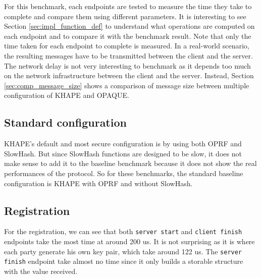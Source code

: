 \documentclass[../report.tex]{subfiles}
\begin{document}
For this benchmark, each endpoints are tested to measure the time they take to complete and compare them using different parameters. 
It is interesting to see Section \ref{sec:impl_function_def} to understand what operations are computed on each endpoint and to compare it with the benchmark result.
Note that only the time taken for each endpoint to complete is measured. In a real-world scenario, the resulting messages have to be transmitted between the client and the server. The network delay is not very interesting to benchmark as it depends too much on the network infrastructure between the client and the server. Instead, Section \ref{sec:comp_message_size} shows a comparison of message size between multiple configuration of KHAPE and OPAQUE.


\subsection{Standard configuration}
KHAPE's default and most secure configuration is by using both OPRF and SlowHash. 
But since SlowHash functions are designed to be slow, it does not make sense to add it to the baseline benchmark because it does not show the real performances of the protocol.
So for these benchmarks, the standard baseline configuration is KHAPE with OPRF and without SlowHash.


\pgfplotsset{width=\textwidth-1.1cm}


\subsection*{Registration}
For the registration, we can see that both \verb|server start| and \verb|client finish| endpoints take the most time at around 200 us.
It is not surprising as it is where each party generate his own key pair, which take around 122 us.
The \verb|server finish| endpoint take almost no time since it only builds a storable structure with the value received.


\end{document}
